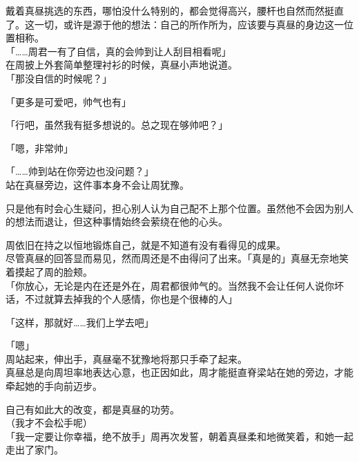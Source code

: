 戴着真昼挑选的东西，哪怕没什么特别的，都会觉得高兴，腰杆也自然而然挺直了。这一切，或许是源于他的想法：自己的所作所为，应该要与真昼的身边这一位置相称。\\

「……周君一有了自信，真的会帅到让人刮目相看呢」\\

在周披上外套简单整理衬衫的时候，真昼小声地说道。\\

「那没自信的时候呢？」

「更多是可爱吧，帅气也有」

「行吧，虽然我有挺多想说的。总之现在够帅吧？」

「嗯，非常帅」

「……帅到站在你旁边也没问题？」\\

站在真昼旁边，这件事本身不会让周犹豫。

只是他有时会心生疑问，担心别人认为自己配不上那个位置。虽然他不会因为别人的想法而退让，但这种事情始终会萦绕在他的心头。

周依旧在持之以恒地锻炼自己，就是不知道有没有看得见的成果。\\

尽管真昼的回答显而易见，然而周还是不由得问了出来。「真是的」真昼无奈地笑着摸起了周的脸颊。\\

「你放心，无论是内在还是外在，周君都很帅气的。当然我不会让任何人说你坏话，不过就算去掉我的个人感情，你也是个很棒的人」

「这样，那就好……我们上学去吧」

「嗯」\\

周站起来，伸出手，真昼毫不犹豫地将那只手牵了起来。\\

真昼总是向周坦率地表达心意，也正因如此，周才能挺直脊梁站在她的旁边，才能牵起她的手向前迈步。

自己有如此大的改变，都是真昼的功劳。\\

（我才不会松手呢）\\

「我一定要让你幸福，绝不放手」周再次发誓，朝着真昼柔和地微笑着，和她一起走出了家门。
